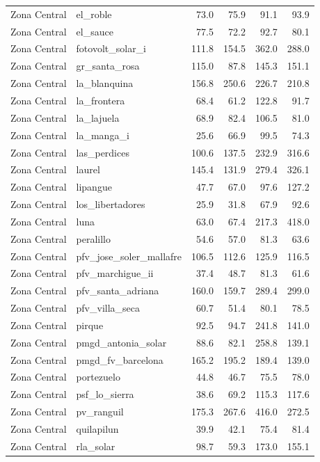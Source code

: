 {\begin{longtable}{llrrrr}
Zona Central & el\_roble & 73.0 & 75.9 & 91.1 & 93.9 \\
Zona Central & el\_sauce & 77.5 & 72.2 & 92.7 & 80.1 \\
Zona Central & fotovolt\_solar\_i & 111.8 & 154.5 & 362.0 & 288.0 \\
Zona Central & gr\_santa\_rosa & 115.0 & 87.8 & 145.3 & 151.1 \\
Zona Central & la\_blanquina & 156.8 & 250.6 & 226.7 & 210.8 \\
Zona Central & la\_frontera & 68.4 & 61.2 & 122.8 & 91.7 \\
Zona Central & la\_lajuela & 68.9 & 82.4 & 106.5 & 81.0 \\
Zona Central & la\_manga\_i & 25.6 & 66.9 & 99.5 & 74.3 \\
Zona Central & las\_perdices & 100.6 & 137.5 & 232.9 & 316.6 \\
Zona Central & laurel & 145.4 & 131.9 & 279.4 & 326.1 \\
Zona Central & lipangue & 47.7 & 67.0 & 97.6 & 127.2 \\
Zona Central & los\_libertadores & 25.9 & 31.8 & 67.9 & 92.6 \\
Zona Central & luna & 63.0 & 67.4 & 217.3 & 418.0 \\
Zona Central & peralillo & 54.6 & 57.0 & 81.3 & 63.6 \\
Zona Central & pfv\_jose\_soler\_mallafre & 106.5 & 112.6 & 125.9 & 116.5 \\
Zona Central & pfv\_marchigue\_ii & 37.4 & 48.7 & 81.3 & 61.6 \\
Zona Central & pfv\_santa\_adriana & 160.0 & 159.7 & 289.4 & 299.0 \\
Zona Central & pfv\_villa\_seca & 60.7 & 51.4 & 80.1 & 78.5 \\
Zona Central & pirque & 92.5 & 94.7 & 241.8 & 141.0 \\
Zona Central & pmgd\_antonia\_solar & 88.6 & 82.1 & 258.8 & 139.1 \\
Zona Central & pmgd\_fv\_barcelona & 165.2 & 195.2 & 189.4 & 139.0 \\
Zona Central & portezuelo & 44.8 & 46.7 & 75.5 & 78.0 \\
Zona Central & psf\_lo\_sierra & 38.6 & 69.2 & 115.3 & 117.6 \\
Zona Central & pv\_ranguil & 175.3 & 267.6 & 416.0 & 272.5 \\
Zona Central & quilapilun & 39.9 & 42.1 & 75.4 & 81.4 \\
Zona Central & rla\_solar & 98.7 & 59.3 & 173.0 & 155.1 \\

\end{longtable}}
